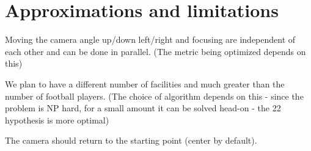 \section{Approximations and limitations}
 
Moving the camera angle up/down left/right and focusing are independent of each other and can be done in parallel. (The metric being optimized depends on this)

 
We plan to have a different number of facilities and much greater than the number of football players. (The choice of algorithm depends on this - since the problem is NP hard, for a small amount it can be solved head-on - the 22 hypothesis is more optimal)

The camera should return to the starting point (center by default).

 
